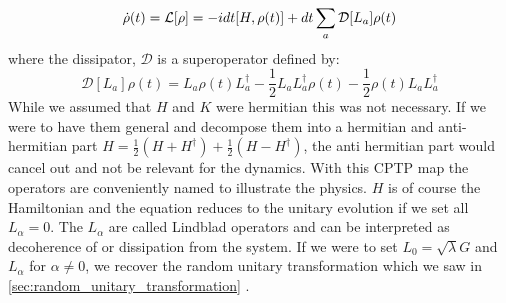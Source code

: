 \begin{equation}\label{eq:lindblad_master_equation}
    \dot{\rho}(t) = \mathcal{L}[\rho] = -i dt[H, \rho(t)] +  dt \sum_a \mathcal{D}[L_a]\rho(t)
\end{equation}
where the dissipator, $\mathcal{D}$ is a superoperator defined by:
\begin{equation}
   \mathcal{D}[L_a]\rho(t) = L_a \rho(t) L_a^\dagger - \frac12 L_a L_a^\dagger \rho(t) - \frac12 \rho(t)L_a L_a^\dagger
\end{equation}
While we assumed that $H$ and $K$ were hermitian this was not necessary. If we were to have them general and decompose them into a hermitian and anti-hermitian part $H = \frac12 (H + H^\dagger) + \frac12(H - H^\dagger)$, the anti hermitian part would cancel out and not be relevant for the dynamics. With this CPTP map the operators are conveniently named to illustrate the physics. $H$ is of course the Hamiltonian and the equation reduces to the unitary evolution if we set all $L_\alpha = 0$. The ${L_\alpha}$ are called Lindblad operators and can be interpreted as decoherence of or dissipation from the system. If we were to set $L_0 = \sqrt{\lambda} G$ and $L_\alpha$ for $\alpha \neq 0$, we recover the random unitary transformation which we saw in \ref{sec:random_unitary_transformation} \cite{preskill_lecture_2018}.





